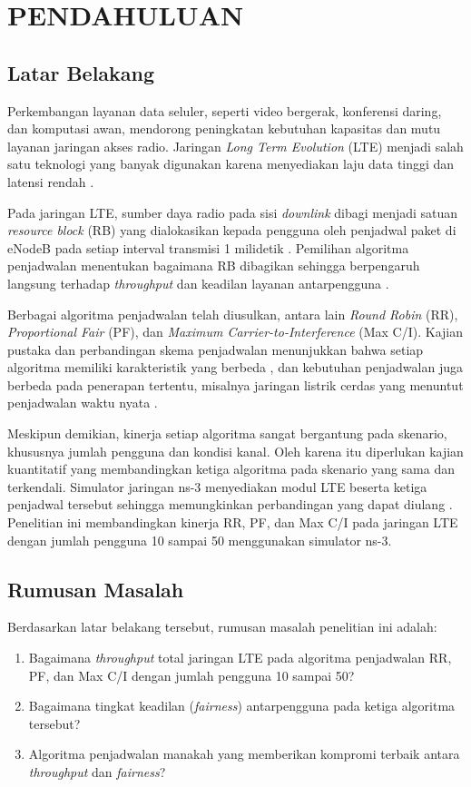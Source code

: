 \chapter{PENDAHULUAN}

\section{Latar Belakang}
Perkembangan layanan data seluler, seperti video bergerak, konferensi daring, dan komputasi awan, mendorong peningkatan kebutuhan kapasitas dan mutu layanan jaringan akses radio. Jaringan \textit{Long Term Evolution} (LTE) menjadi salah satu teknologi yang banyak digunakan karena menyediakan laju data tinggi dan latensi rendah \parencite{ghosh2010,dahlman2011}.

Pada jaringan LTE, sumber daya radio pada sisi \textit{downlink} dibagi menjadi satuan \textit{resource block} (RB) yang dialokasikan kepada pengguna oleh penjadwal paket di eNodeB pada setiap interval transmisi 1 milidetik \parencite{dahlman2011}. Pemilihan algoritma penjadwalan menentukan bagaimana RB dibagikan sehingga berpengaruh langsung terhadap \textit{throughput} dan keadilan layanan antarpengguna \parencite{capozzi2013}.

Berbagai algoritma penjadwalan telah diusulkan, antara lain \textit{Round Robin} (RR), \textit{Proportional Fair} (PF), dan \textit{Maximum Carrier-to-Interference} (Max C/I). Kajian pustaka dan perbandingan skema penjadwalan menunjukkan bahwa setiap algoritma memiliki karakteristik yang berbeda \parencite{andrews2007,alqahtani2013}, dan kebutuhan penjadwalan juga berbeda pada penerapan tertentu, misalnya jaringan listrik cerdas yang menuntut penjadwalan waktu nyata \parencite{xu2012}.

Meskipun demikian, kinerja setiap algoritma sangat bergantung pada skenario, khususnya jumlah pengguna dan kondisi kanal. Oleh karena itu diperlukan kajian kuantitatif yang membandingkan ketiga algoritma pada skenario yang sama dan terkendali. Simulator jaringan ns-3 menyediakan modul LTE beserta ketiga penjadwal tersebut sehingga memungkinkan perbandingan yang dapat diulang \parencite{ns3}. Penelitian ini membandingkan kinerja RR, PF, dan Max C/I pada jaringan LTE dengan jumlah pengguna 10 sampai 50 menggunakan simulator ns-3.

\section{Rumusan Masalah}
Berdasarkan latar belakang tersebut, rumusan masalah penelitian ini adalah:
\begin{enumerate}
\item Bagaimana \textit{throughput} total jaringan LTE pada algoritma penjadwalan RR, PF, dan Max C/I dengan jumlah pengguna 10 sampai 50?
\item Bagaimana tingkat keadilan (\textit{fairness}) antarpengguna pada ketiga algoritma tersebut?
\item Algoritma penjadwalan manakah yang memberikan kompromi terbaik antara \textit{throughput} dan \textit{fairness}?
\end{enumerate}

